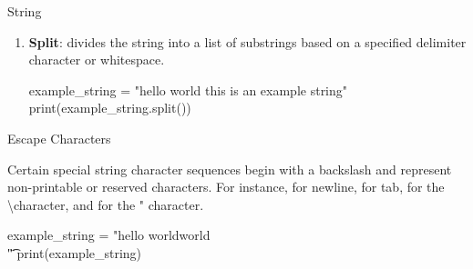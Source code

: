 \documentclass[10pt]{article}
\begin{document}
\begin{core}[label=core:string]{String}
\begin{enumerate}
          \begin{pyconsole}

            example_string = "hello world"
            print(example_string.upper())
            print(example_string.lower())
            print(example_string.title())

          \end{pyconsole}


          \item \textbf{Split}:  divides the string into a list of substrings based on a specified delimiter character or whitespace.

          \begin{pyconsole}

            example_string = "hello world this is an example string"
            print(example_string.split())

          \end{pyconsole}

        \end{enumerate}

      \end{core}

      \begin{core}[label=core:escape_char]{Escape Characters}

        Certain special string character sequences begin with a backslash and represent non-printable or reserved characters. For instance,  for newline,  for tab, \textcode{\textbackslash\textbackslash} for the \textbackslash character, and \textcode{\"} for the " character.

        \begin{pyconsole}

          example_string = "hello world\n\nhello world\\ \t \""
          print(example_string)

        \end{pyconsole}

      \end{core}
\end{document}
